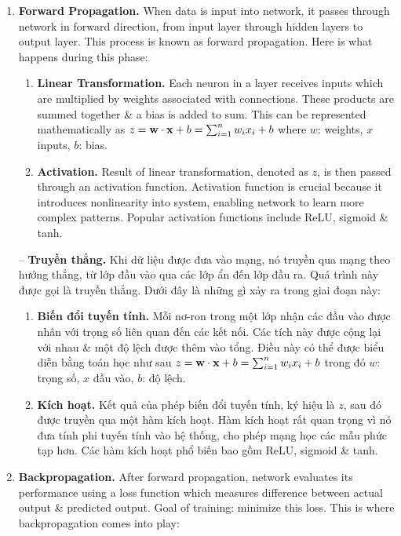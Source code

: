 \documentclass{article}
\begin{document}
\begin{enumerate}
    \item {\bf Forward Propagation.} When data is input into network, it passes through network in forward direction, from input layer through hidden layers to output layer. This process is known as forward propagation. Here is what happens during this phase:
    \begin{enumerate}
        \item {\bf Linear Transformation.} Each neuron in a layer receives inputs which are multiplied by weights associated with connections. These products are summed together \& a bias is added to sum. This can be represented mathematically as $z = {\bf w}\cdot{\bf x} + b = \sum_{i=1}^n w_ix_i + b$ where $w$: weights, $x$ inputs, $b$: bias.
        \item {\bf Activation.} Result of linear transformation, denoted as $z$, is then passed through an activation function. Activation function is crucial because it introduces nonlinearity into system, enabling network to learn more complex patterns. Popular activation functions include ReLU, sigmoid \& tanh.
    \end{enumerate}
    -- {\bf Truyền thẳng.} Khi dữ liệu được đưa vào mạng, nó truyền qua mạng theo hướng thẳng, từ lớp đầu vào qua các lớp ẩn đến lớp đầu ra. Quá trình này được gọi là truyền thẳng. Dưới đây là những gì xảy ra trong giai đoạn này:
    \begin{enumerate}
        \item {\bf Biến đổi tuyến tính.} Mỗi nơ-ron trong một lớp nhận các đầu vào được nhân với trọng số liên quan đến các kết nối. Các tích này được cộng lại với nhau \& một độ lệch được thêm vào tổng. Điều này có thể được biểu diễn bằng toán học như sau $z = {\bf w}\cdot{\bf x} + b = \sum_{i=1}^n w_ix_i + b$ trong đó $w$: trọng số, $x$ đầu vào, $b$: độ lệch.
        \item {\bf Kích hoạt.} Kết quả của phép biến đổi tuyến tính, ký hiệu là $z$, sau đó được truyền qua một hàm kích hoạt. Hàm kích hoạt rất quan trọng vì nó đưa tính phi tuyến tính vào hệ thống, cho phép mạng học các mẫu phức tạp hơn. Các hàm kích hoạt phổ biến bao gồm ReLU, sigmoid \& tanh.
    \end{enumerate}
    \item {\bf Backpropagation.} After forward propagation, network evaluates its performance using a loss function which measures difference between actual output \& predicted output. Goal of training: minimize this loss. This is where backpropagation comes into play:

\end{enumerate}
\end{document}
